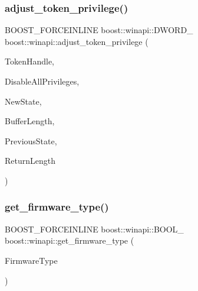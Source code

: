 \subsubsection{\texorpdfstring{adjust\+\_\+token\+\_\+privilege()}{adjust\_token\_privilege()}}
{\footnotesize\ttfamily B\+O\+O\+S\+T\+\_\+\+F\+O\+R\+C\+E\+I\+N\+L\+I\+NE boost\+::winapi\+::\+D\+W\+O\+R\+D\+\_\+ boost\+::winapi\+::adjust\+\_\+token\+\_\+privilege (\begin{DoxyParamCaption}\item[{boost\+::winapi\+::\+H\+A\+N\+D\+L\+E\+\_\+}]{Token\+Handle,  }\item[{boost\+::winapi\+::\+B\+O\+O\+L\+\_\+}]{Disable\+All\+Privileges,  }\item[{\mbox{\hyperlink{namespaceboost_1_1winapi_a9d5f985cca2c6c8adc061e489ff44b99}{boost\+::winapi\+::\+P\+T\+O\+K\+E\+N\+\_\+\+P\+R\+I\+V\+I\+L\+E\+G\+E\+S\+\_\+}}}]{New\+State,  }\item[{boost\+::winapi\+::\+D\+W\+O\+R\+D\+\_\+}]{Buffer\+Length,  }\item[{\+\_\+\+Out\+\_\+writes\+\_\+bytes\+\_\+to\+\_\+opt\+\_\+(Buffer\+Length, $\ast$Return\+Length) \mbox{\hyperlink{namespaceboost_1_1winapi_a9d5f985cca2c6c8adc061e489ff44b99}{boost\+::winapi\+::\+P\+T\+O\+K\+E\+N\+\_\+\+P\+R\+I\+V\+I\+L\+E\+G\+E\+S\+\_\+}}}]{Previous\+State,  }\item[{boost\+::winapi\+::\+P\+D\+W\+O\+R\+D\+\_\+}]{Return\+Length }\end{DoxyParamCaption})}

\mbox{\label{namespaceboost_1_1winapi_a7035334ec9418a5d061138f20e089f17}} 
\subsubsection{\texorpdfstring{get\+\_\+firmware\+\_\+type()}{get\_firmware\_type()}}
{\footnotesize\ttfamily B\+O\+O\+S\+T\+\_\+\+F\+O\+R\+C\+E\+I\+N\+L\+I\+NE boost\+::winapi\+::\+B\+O\+O\+L\+\_\+ boost\+::winapi\+::get\+\_\+firmware\+\_\+type (\begin{DoxyParamCaption}\item[{\mbox{\hyperlink{namespaceboost_1_1winapi_ab2bb3265a50b62bf9ddb48517baf2b10}{boost\+::winapi\+::\+F\+I\+R\+M\+W\+A\+R\+E\+\_\+\+T\+Y\+P\+E\+\_\+}} $\ast$}]{Firmware\+Type }\end{DoxyParamCaption})\hspace{0.3cm}{\ttfamily [noexcept]}}

